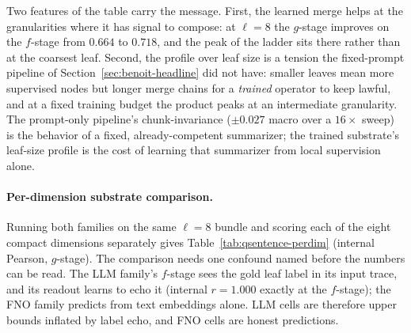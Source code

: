 Two features of the table carry the message. First, the learned merge
helps at the granularities where it has signal to compose: at
$\ell = 8$ the $g$-stage improves on the $f$-stage from $0.664$ to
$0.718$, and the peak of the ladder sits there rather than at the
coarsest leaf. Second, the profile over leaf size is a tension the
fixed-prompt pipeline of Section~\ref{sec:benoit-headline} did not have:
smaller leaves mean more supervised nodes but longer merge chains for
a \emph{trained} operator to keep lawful, and at a fixed training
budget the product peaks at an intermediate granularity. The
prompt-only pipeline's chunk-invariance ($\pm 0.027$ macro over a
$16\times$ sweep) is the behavior of a fixed, already-competent
summarizer; the trained substrate's leaf-size profile is the cost of
learning that summarizer from local supervision alone.

\paragraph{Per-dimension substrate comparison.} Running both families
on the same $\ell = 8$ bundle and scoring each of the eight compact
dimensions separately gives Table~\ref{tab:qsentence-perdim} (internal
Pearson, $g$-stage). The comparison needs one confound named before
the numbers can be read. The LLM family's $f$-stage sees the gold leaf
label in its input trace, and its readout learns to echo it
(internal $r = 1.000$ exactly at the $f$-stage); the FNO family
predicts from text embeddings alone. LLM cells are therefore
upper bounds inflated by label echo, and FNO cells are honest
predictions.

